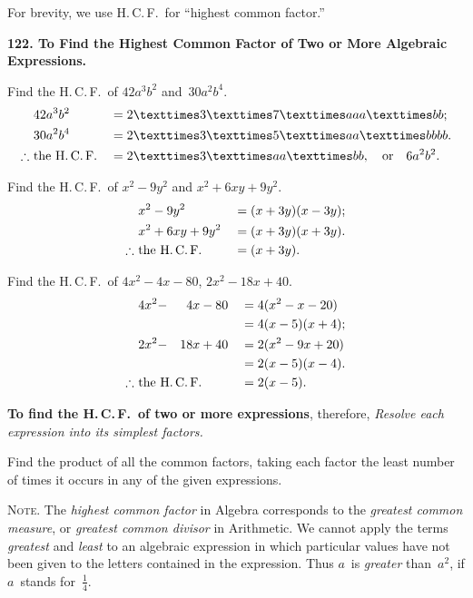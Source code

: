 \documentclass[12pt]{book}[2005/09/16]
\newcommand{\Require}[1][2\baselineskip]{%
  \setlength{\TmpLen}{\pagegoal-\pagetotal}%
  \ifthenelse{\lengthtest{0pt < \TmpLen}\and\lengthtest{\TmpLen < #1}}{%
    \vfil\newpage%
  }{}%
}
\newcommand{\Paragraph}[1]{\medskip\par\textbf{#1}}
\newcommand{\Dictum}[1]{\Require\textbf{#1}}
\newenvironment{Remark}[1][]{\par\small\textsc{#1}}{\par}
\newenvironment{Theorem}[1][]{%
  \ifthenelse{\not\equal{#1}{nopar}}{\smallskip\par#1}{}%
  \itshape}{\medskip\upshape\par}
\newcommand{\Item}[1]{\vspace{4pt plus 16pt}\makebox[1em][r]{\textbf{#1}\ }}
\newlength{\TmpLen}
\newcommand{\HCF}{H.\,C.\,F.}
\begin{document}
For brevity, we use \HCF\ for ``highest common factor.''

\Paragraph{122.  To Find the Highest Common Factor of Two or More
Algebraic Expressions.}

\Item{1.}  Find the \HCF\ of $42a^{3}b^{2}$ and~$30a^{2}b^{4}$.
\begin{alignat*}{2}
&42a^{3}b^{2} &&= 2 × 3 × 7 × aaa × bb; \\
&30a^{2}b^{4} &&= 2 × 3 × 5 × aa × bbbb. \\
\therefore\ &\text{the \HCF} &&= 2 × 3 × aa × bb,
\quad\text{or}\quad 6a^{2}b^{2}.
\end{alignat*}

\Item{2.}  Find the \HCF\ of $x^{2} - 9y^{2}$ and $x^{2} + 6xy + 9y^{2}$.
\begin{alignat*}{2}
&x^{2} - 9y^{2} &&= (x + 3y)(x - 3y); \\
&x^{2} + 6xy + 9y^{2} &&= (x + 3y)(x + 3y). \\
\therefore\ &\text{the \HCF} &&= (x + 3y).
\end{alignat*}

\Item{3.}  Find the \HCF\ of $4x^{2} - 4x - 80$, $2x^{2} - 18x + 40$.
\begin{alignat*}{3}
&4x^{2} -& 4x &- 80 &&= 4(x^{2} - x-20) \\
&&&                 &&= 4(x - 5)(x + 4); \\
&2x^{2} -& 18x &+ 40 &&= 2(x^{2} - 9x + 20) \\
&&&                  &&= 2(x - 5)(x - 4). \\
\therefore\ &\rlap{\text{the \HCF}} &&&&= 2(x - 5).
\end{alignat*}

\Dictum{To find the \HCF\ of two or more expressions}, therefore,
\begin{Theorem}
Resolve each expression into its simplest factors.

Find the product of all the common factors, taking each
factor the least number of times it occurs in any of the given
expressions.
\end{Theorem}

\begin{Remark}[Note.] The \emph{highest common factor} in Algebra corresponds to the
\emph{greatest common measure}, or \emph{greatest common divisor} in Arithmetic.
We cannot apply the terms \emph{greatest} and \emph{least} to an algebraic expression
in which particular values have not been given to the letters
contained in the expression.  Thus $a$~is \emph{greater} than~$a^{2}$, if $a$~stands
for~$\frac{1}{4}$.
\end{Remark}
\end{document}
